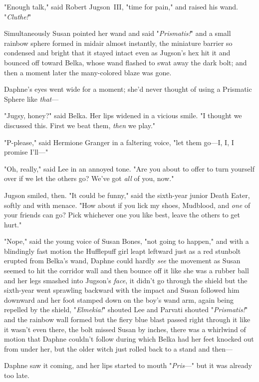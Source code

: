 "Enough talk," said Robert Jugson~III, "time for pain," and raised his wand.
"\emph{Cluthe!}"

Simultaneously Susan pointed her wand and said "\emph{Prismatis!}" and a small
rainbow sphere formed in midair almost instantly, the miniature barrier so
condensed and bright that it stayed intact even as Jugson's hex hit it and
bounced off toward Belka, whose wand flashed to swat away the dark bolt; and
then a moment later the many-colored blaze was gone.

Daphne's eyes went wide for a moment; she'd never thought of using a Prismatic
Sphere like \emph{that}---

"Jugsy, honey?" said Belka. Her lips widened in a vicious smile. "I thought we
discussed this. First we beat them, \emph{then} we play."

"P-please," said Hermione Granger in a faltering voice, "let them go---I, I, I
promise I'll\mbox{---}"

"Oh, really," said Lee in an annoyed tone. "Are you about to offer to turn
yourself over if we let the others go? We've got \emph{all} of you, now."

Jugson smiled, then. "It could be funny," said the sixth-year junior Death
Eater, softly and with menace. "How about if you lick my shoes, Mudblood, and
\emph{one} of your friends can go? Pick whichever one you like best, leave the
others to get hurt."

"Nope," said the young voice of Susan Bones, "not going to happen," and with a
blindingly fast motion the Hufflepuff girl leapt leftward just as a red
stunbolt erupted from Belka's wand, Daphne could hardly \emph{see} the movement
as Susan seemed to hit the corridor wall and then bounce off it like she was a
rubber ball and her legs smashed into Jugson's \emph{face}, it didn't go
through the shield but the sixth-year went sprawling backward with the impact
and Susan followed him downward and her foot stamped down on the boy's wand
arm, again being repelled by the shield, "\emph{Elmekia!}" shouted Lee and
Parvati shouted "\emph{Prismatis!}" and the rainbow wall formed but the fiery
blue blast passed right through it like it wasn't even there, the bolt missed
Susan by inches, there was a whirlwind of motion that Daphne couldn't follow
during which Belka had her feet knocked out from under her, but the older witch
just rolled back to a stand and then---

Daphne saw it coming, and her lips started to mouth "\emph{Pris}\mbox{---}" but it was
already too late.

